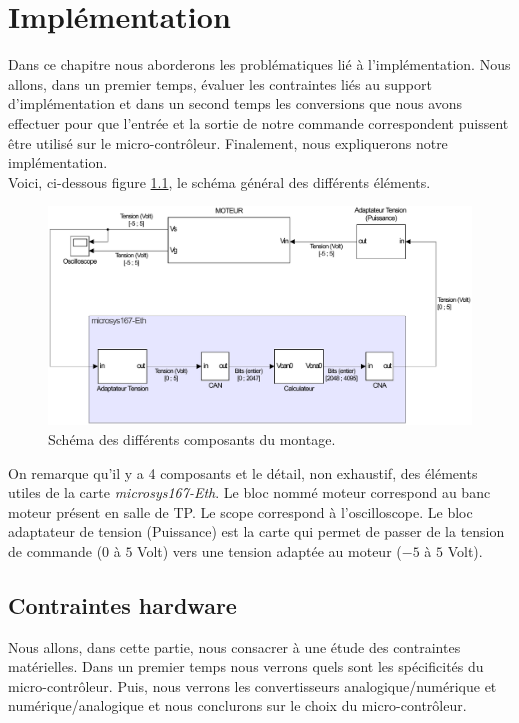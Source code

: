 \chapter{Implémentation}
\label{chap:implem}
Dans ce chapitre nous aborderons les problématiques lié à l'implémentation. Nous allons, dans un premier temps, évaluer les contraintes liés au support d'implémentation et dans un second temps les conversions que nous avons effectuer pour que l'entrée et la sortie de notre commande correspondent puissent être utilisé sur le micro-contrôleur. Finalement, nous expliquerons notre implémentation.\\

Voici, ci-dessous figure \ref{fig:GeneralSCHEMA}, le schéma général des différents éléments.	
\begin{figure}[!ht]
\centering 
\includegraphics[width=.7\textwidth]{./V/images/schemaMO_MICRO.pdf}
\caption{\label{fig:GeneralSCHEMA}Schéma des différents composants du montage.}
\end{figure}
On remarque qu'il y a 4 composants et le détail, non exhaustif, des éléments utiles de la carte \emph{microsys167-Eth}.
Le bloc nommé moteur correspond au banc moteur présent en salle de TP. Le scope correspond à l'oscilloscope. Le bloc adaptateur de tension (Puissance) est la carte qui permet de passer de la tension de commande ($0$ à $5$ Volt) vers une tension adaptée au moteur ($-5$ à $5$ Volt).
\section{Contraintes hardware} 
Nous allons, dans cette partie, nous consacrer à une étude des contraintes matérielles. Dans un premier temps nous verrons quels sont les spécificités du micro-contrôleur. Puis, nous verrons les convertisseurs analogique/numérique et numérique/analogique et nous conclurons sur le choix du micro-contrôleur. 
